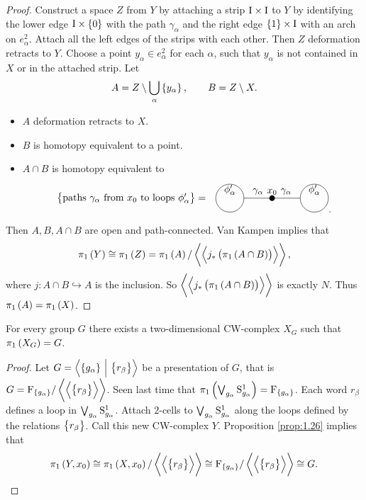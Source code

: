 \begin{proof}
Construct a space $ Z $ from $ Y $ by attaching a strip $ \I \times \I $ to $ Y $ by identifying the lower edge $ \I \times \cbr{0} $ with the path $ \gamma_\alpha $ and the right edge $ \cbr{1} \times \I $ with an arch on $ e_\alpha^2 $. Attach all the left edges of the strips with each other. Then $ Z $ deformation retracts to $ Y $. Choose a point $ y_\alpha \in e_\alpha^2 $ for each $ \alpha $, such that $ y_\alpha $ is not contained in $ X $ or in the attached strip. Let
$$ A = Z \setminus \bigcup_\alpha \cbr{y_\alpha}, \qquad B = Z \setminus X. $$
\begin{itemize}
\item $ A $ deformation retracts to $ X $.
\item $ B $ is homotopy equivalent to a point.
\item $ A \cap B $ is homotopy equivalent to
$$
\begin{tikzpicture}
\draw (-5, 0) node{$ \cbr{\text{paths} \ \gamma_\alpha \ \text{from} \ x_0 \ \text{to loops} \ \phi_\alpha'} = $};
\fill (0, 0) circle (0.1) node[above]{$ x_0 $};
\draw (0, 0) to node[above]{$ \gamma_\alpha $} (-1, 0);
\draw (0, 0) to node[above]{$ \gamma_\alpha $} (1, 0);
\draw (-1.5, 0) circle (0.5) node[above]{$ \phi_\alpha' $};
\draw (1.5, 0) circle (0.5) node[above]{$ \phi_\alpha' $};
\end{tikzpicture}.
$$
\end{itemize}
Then $ A, B, A \cap B $ are open and path-connected. Van Kampen implies that
$$ \pi_1\br{Y} \cong \pi_1\br{Z} = \pi_1\br{A} / \abr{\abr{j_*\br{\pi_1\br{A \cap B}}}}, $$
where $ j : A \cap B \hookrightarrow A $ is the inclusion. So $ \abr{\abr{j_*\br{\pi_1\br{A \cap B}}}} $ is exactly $ N $. Thus $ \pi_1\br{A} = \pi_1\br{X} $.
\end{proof}

\pagebreak


\begin{corollary}
For every group $ G $ there exists a two-dimensional CW-complex $ X_G $ such that $ \pi_1\br{X_G} = G $.
\end{corollary}

\begin{proof}
Let $ G = \abr{\cbr{g_\alpha} \st \cbr{r_\beta}} $ be a presentation of $ G $, that is $ G = \F_{\cbr{g_\alpha}} / \abr{\abr{\cbr{r_\beta}}} $. Seen last time that $ \pi_1\br{\bigvee_{g_\alpha} \S_{g_\alpha}^1} = \F_{\cbr{g_\alpha}} $. Each word $ r_\beta $ defines a loop in $ \bigvee_{g_\alpha} \S_{g_\alpha}^1 $. Attach $ 2 $-cells to $ \bigvee_{g_\alpha} \S_{g_\alpha}^1 $ along the loops defined by the relations $ \cbr{r_\beta} $. Call this new CW-complex $ Y $. Proposition \ref{prop:1.26} implies that
$$ \pi_1\br{Y, x_0} \cong \pi_1\br{X, x_0} / \abr{\abr{\cbr{r_\beta}}} \cong \F_{\cbr{g_\alpha}} / \abr{\abr{\cbr{r_\beta}}} \cong G. $$
\end{proof}

